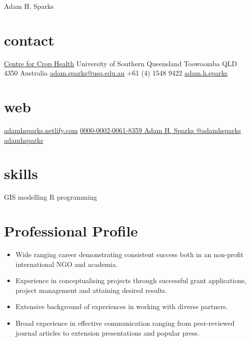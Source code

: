 
\hfill {\Huge Adam H. Sparks}
\begin{aside}
\small{\section{contact}}
\small{\href{http://www.usq.edu.au/research/research-at-usq/institutes-centres/cch}{Centre for Crop Health}}
\small{University of Southern Queensland}
\small{Toowoomba QLD 4350}
\small{Australia}
\small{\href{mailto:adam.sparks@usq.edu.au}{adam.sparks@usq.edu.au}}
\small{+61 (4) 1548 9422 \faMobilePhone{}}
\small{\href{skype:adam.h.sparks?call}{adam.h.sparks }}
\section{web}
	\footnotesize{\href{https://adamhsparks.netlify.com}{adamhsparks.netlify.com}\FA {}}
	\footnotesize{\href{http://orcid.org/0000-0002-0061-8359}{0000-0002-0061-8359 {\color{orcid.green}}}}
	\footnotesize{\href{https://www.linkedin.com/in/adam-h-sparks-507b968}{Adam H. Sparks {\color{linkedin}\FA {}}}}
	\footnotesize{\href{https://www.twitter.com/adamhsparks/}{@adamhsparks {\color{twitter.blue}\FA {}}}}
	\footnotesize{\href{https://github.com/adamhsparks/}{adamhsparks \FA {}}}
\footnotesize{\section{skills}}
\small{GIS}
\small{modelling}
\small{R programming}
\end{aside}

\section*{Professional Profile}

\begin{itemize}
\setlength{\leftmargin}{0pt}
\item Wide ranging career demonstrating consistent success both in an non-profit international NGO and academia.
\item Experience in conceptualising projects through successful grant applications, project management and attaining desired results.
\item Extensive background of experiences in working with diverse partners.
\item Broad experience in effective communication ranging from peer-reviewed journal articles to extension presentations and popular press.
\end{itemize}


